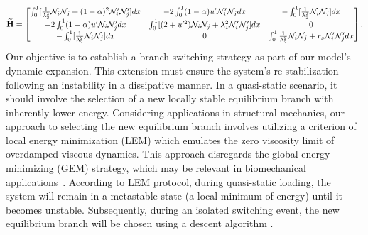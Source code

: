 \begin{equation}
    \widetilde{\mathbf{H}}=
    \begin{bmatrix}
    \int_0^1[ \frac{1}{\lambda_2^2}{\mathcal N}_i{\mathcal N}_j + (1-\alpha)^2{\mathcal N}'_i{\mathcal N}'_j] dx&
-2\int_0^1(1-\alpha)u' {\mathcal N}'_i {\mathcal N}_j  dx&
-\int_0^1[\frac{1}{\lambda_2^2}{\mathcal N}_i {\mathcal N}_j]  dx\\

-2\int_0^1(1-\alpha)u' {\mathcal N}_i {\mathcal N}'_j dx&
 \int_0^1 [ (2+u'^2){\mathcal N}_i{\mathcal N}_j +\lambda_1^2{\mathcal N}'_i{\mathcal N}'_j] dx&
 0\\

-\int_0^1[\frac{1}{\lambda_2^2}{\mathcal N}_i{\mathcal N}_j ] dx
&0
&\int_0^1\frac{1}{\lambda_2^2}{\mathcal N}_i {\mathcal N}_j+r_s{\mathcal N}'_i {\mathcal N}'_j  dx
\end{bmatrix}.
\label{eq:stifness2}
\end{equation}
Our objective is to establish a branch switching strategy as part of our model's dynamic expansion. This extension must ensure the system's re-stabilization following an instability in a dissipative manner. In a quasi-static scenario, it should involve the selection of a new locally stable equilibrium branch with inherently lower energy.  Considering applications in structural mechanics, our approach to selecting the new equilibrium branch involves utilizing a criterion of local energy minimization (LEM)  which emulates the zero viscosity limit of overdamped viscous dynamics. This approach disregards the global energy minimizing (GEM) strategy, which may be relevant in biomechanical applications~\cite{Salman2021-mn}. According to LEM protocol, during quasi-static loading, the system will remain in a metastable state (a local minimum of energy) until it becomes unstable. Subsequently, during an isolated switching event, the new equilibrium branch will be chosen using a descent algorithm \cite{Puglisi2005-lg}.
